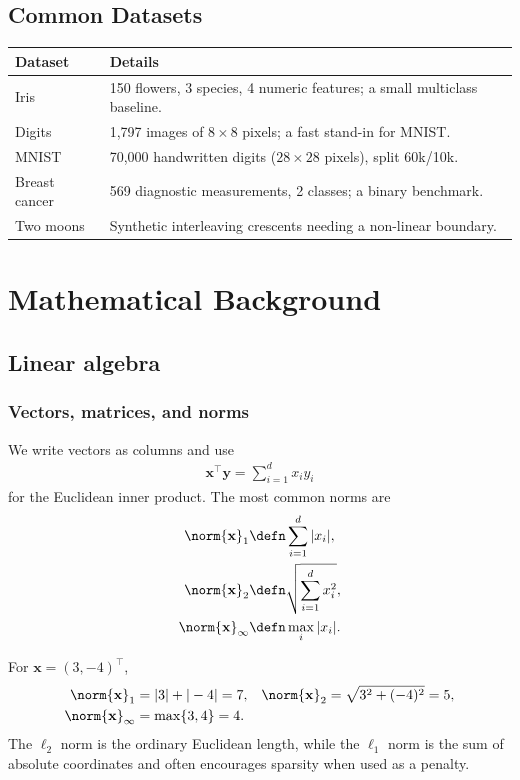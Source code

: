 \documentclass[a4paper, 12pt]{book}
\begin{document}
\newpage
\section*{Common Datasets}

\begin{center}
\renewcommand{\arraystretch}{1.25}
\begin{tabular}{ll}
\toprule
Dataset & Details \\
\midrule
Iris & 150 flowers, 3 species, 4 numeric features; a small multiclass baseline. \\
Digits & 1,797 images of $8\times8$ pixels; a fast stand-in for MNIST. \\
MNIST & 70,000 handwritten digits ($28\times28$ pixels), split 60k/10k. \\
Breast cancer & 569 diagnostic measurements, 2 classes; a binary benchmark. \\
Two moons & Synthetic interleaving crescents needing a non-linear boundary. \\
\bottomrule
\end{tabular}
\end{center}

\mainmatter

\chapter{Mathematical Background}
\label{ch:calc}

\section{Linear algebra}

\subsection{Vectors, matrices, and norms}

We write vectors as columns and use
\begin{align}
    \mathbf{x}^\top \mathbf{y} = \sum_{i=1}^d x_i y_i
\end{align}
for the Euclidean inner product. The most common norms are
\begin{align}
    \norm{\mathbf{x}}_1 &\defn \sum_{i=1}^d |x_i|, \\
    \norm{\mathbf{x}}_2 &\defn \sqrt{\sum_{i=1}^d x_i^2}, \\
    \norm{\mathbf{x}}_\infty &\defn \max_i |x_i|.
\end{align}
\begin{example}
    For $\mathbf{x} = (3,-4)^\top$,
    \begin{align}
        \norm{\mathbf{x}}_1 &= |3|+|-4| = 7, &
        \norm{\mathbf{x}}_2 &= \sqrt{3^2+(-4)^2} = 5, \\
        \norm{\mathbf{x}}_\infty &= \max\{3,4\} = 4.
    \end{align}
    The $\ell_2$ norm is the ordinary Euclidean length, while the $\ell_1$ norm is
    the sum of absolute coordinates and often encourages sparsity when used as a
    penalty.
\end{example}
\end{document}
